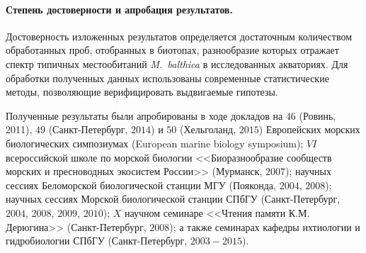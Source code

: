 \paragraph{Степень достоверности и апробация результатов.}
Достоверность изложенных результатов определяется достаточным количеством обработанных проб, отобранных в биотопах, разнообразие которых отражает спектр типичных местообитаний \textit{M.~balthica} в исследованных акваториях.
Для обработки полученных данных использованы современные статистические методы, позволяющие верифицировать выдвигаемые гипотезы.

Полученные результаты были апробированы в ходе докладов на 
$46$ (Ровинь, 2011), $49$ (Санкт-Петербург, $2014$) и $50$ (Хельголанд,  $2015$) Европейских морских биологических симпозиумах (European marine biology symposium); 
$VI$ всероссийской школе по морской биологии <<Биоразнообразие сообществ морских и пресноводных экосистем России>> (Мурманск, $2007$); 
научных сессиях Беломорской биологической станции МГУ (Пояконда, $2004$, $2008$); 
научных сессиях Морской биологической станции СПбГУ (Санкт-Петербург, $2004$, $2008$, $2009$, $2010$); 
$X$ научном семинаре <<Чтения памяти К.М. Дерюгина>> (Санкт-Петербург, $2008$); 
а также семинарах кафедры  ихтиологии и гидробиологии СПбГУ (Санкт-Петербург, $2003 - 2015$).

